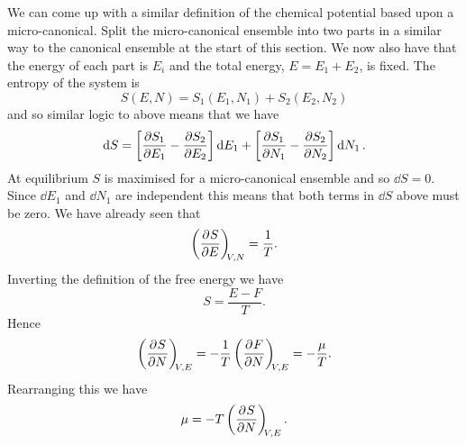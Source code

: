 \documentclass[a4paper]{article}
\begin{document}
    We can come up with a similar definition of the chemical potential based upon a micro-canonical.
    Split the micro-canonical ensemble into two parts in a similar way to the canonical ensemble at the start of this section.
    We now also have that the energy of each part is \(E_i\) and the total energy, \(E = E_1 + E_2\), is fixed.
    The entropy of the system is
    \[S(E, N) = S_1(E_1, N_1) + S_2(E_2, N_2)\]
    and so similar logic to above means that we have
    \[\dd{S} = \left[\pdv{S_1}{E_1} - \pdv{S_2}{E_2}\right]\dd{E_1} + \left[\pdv{S_1}{N_1} - \pdv{S_2}{N_2}\right]\dd{N_1}.\]
    At equilibrium \(S\) is maximised for a micro-canonical ensemble and so \(\dd{S} = 0\).
    Since \(\dd{E_1}\) and \(\dd{N_1}\) are independent this means that both terms in \(\dd{S}\) above must be zero.
    We have already seen that
    \[\left(\pdv[]{S}{E}\right)_{\!\!{V,N}} = \frac{1}{T}.\]
    Inverting the definition of the free energy we have
    \[S = \frac{E - F}{T}.\]
    Hence
    \[\left(\pdv[]{S}{N}\right)_{\!\!{V, E}} = -\frac{1}{T}\left(\pdv[]{F}{N}\right)_{\!\!{V, E}} = -\frac{\mu}{T}.\]
    Rearranging this we have
    \[\mu = -T\left(\pdv[]{S}{N}\right)_{\!\!{V, E}}.\]
    
\end{document}
